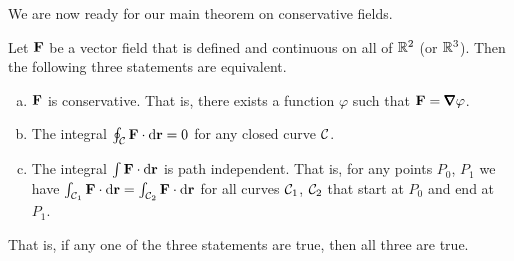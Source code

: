 We are now ready for our main theorem on conservative fields.
\begin{theorem}\label{thm:pathIndepConserv}
Let $\mathbf{F}$ be a vector field that is defined and continuous on all of $\mathbb{R}^2$
(or $\mathbb{R}^3$). Then the following three statements are equivalent.
\begin{enumerate}[(a)]
\item
$\mathbf{F}$ is conservative. That is, there exists a function $\varphi$ such that
$\vF=\vnabla\varphi$.
\item
The integral $\oint_{\mathcal{C}}\mathbf{F}\cdot\mathrm{d}\mathbf{r}=0$ for any closed curve $\mathcal{C}$.

\item
The integral $\int\mathbf{F}\cdot\mathrm{d}\mathbf{r}$ is path independent. That is,
for any points $P_0$, $P_1$ we have 
$
\int_{\mathcal{C}_1}\mathbf{F}\cdot\mathrm{d}\mathbf{r}=
\int_{\mathcal{C}_2}\mathbf{F}\cdot\mathrm{d}\mathbf{r}
$
for all curves $\mathcal{C}_1$, $\mathcal{C}_2$ that start at $P_0$ and end at $P_1$.
\end{enumerate}
That is, if any one of the three statements are true, then all three are true.
\end{theorem}

